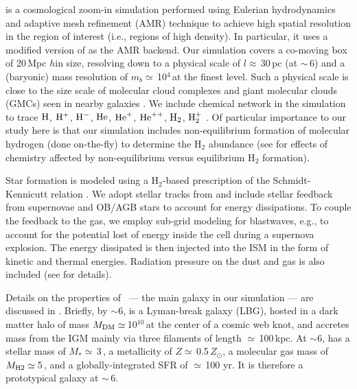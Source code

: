 \IfFileExists{emulateapjlegacy.cls}{\documentclass[iop]{emulateapjlegacy}}{\documentclass[iop]{emulateapj}}
\begin{document}
 is a cosmological zoom-in simulation performed using Eulerian hydrodynamics and
adaptive mesh refinement (AMR) technique to achieve high spatial resolution in the region of interest (i.e., regions of high density).
In particular, it uses a modified version of  \citep{Teyssier2002a} as the AMR backend.
Our simulation covers a co-moving box of 20\,Mpc $h$\pmOne in size, resolving down to a physical scale of $l\approx$\,30\,pc (at \z$\sim$\,6) and a (baryonic) mass resolution of $m_b\simeq$\,10$^4$\,\Msun at the finest level. Such a physical scale is close to the size scale of molecular cloud complexes and giant molecular clouds (GMCs) seen in nearby galaxies \citep[e.g.,][]{Sanders85a, Federrath13a, Goodman14a}.
We include chemical network in the simulation to trace $\rm{H}$, $\rm{H}^{+}$, $\rm{H}^{-}$, $\rm{He}$, $\rm{He}^{+}$, $\rm{He}^{++}$, $\rm{H}_2$, $\rm{H}_2^{+}$ \citep{Grassi14a,Bovino16a}.
Of particular importance to our study here is that our simulation includes non-equilibrium formation of molecular hydrogen (done on-the-fly) to determine the H$_2$ abundance (see \citealt{Pallottini17b} for effects of chemistry affected by non-equilibrium versus equilibrium H$_2$ formation).

Star formation is modeled using a H$_2$-based prescription of the Schmidt-Kennicutt relation \citep{Krumholz09a}. We adopt stellar tracks from  and include stellar feedback from supernovae and OB/AGB stars to account for energy dissipations. To couple the feedback to the gas, we employ sub-grid modeling for blastwaves, e.g., to account for the potential lost of energy inside the cell during a supernova explosion. The energy dissipated is then injected into the ISM in the form of kinetic and thermal energies. Radiation pressure on the dust and gas is also included (see \citealt{Pallottini17a} for details).

Details on the properties of \flower\ --- the main galaxy in our simulation --- are discussed in \citet{Pallottini17b}.
Briefly, by \z$\sim$6, \flower is a Lyman-break galaxy (LBG), hosted in a dark matter halo of mass $M_{\rm DM}\simeq$\,10$^{10}$\,\Msun at the center of a cosmic web knot, and accretes mass from the IGM mainly via three filaments of length $\simeq$\,100\,kpc. At \z$\sim$6, \flower has a stellar mass of $M_*\simeq$\,3\,\Msun, a metallicity of $Z\simeq$\,0.5\,$Z_{\odot}$, a molecular gas mass of $M_{\rm H2}\simeq$\,5\,\Msun, and a globally-integrated SFR of $\simeq$\,100\,\Msun\,yr\pmOne. It is therefore a prototypical galaxy at \z$\sim$\,6.
\end{document}

